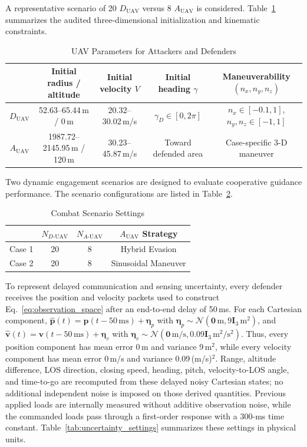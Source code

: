 \documentclass[lettersize,journal]{IEEEtran}
\begin{document}
A representative scenario of 20 $D_{\text{UAV}}$ versus 8 $A_{\text{UAV}}$ is considered.
Table~\ref{chushicanshu} summarizes the audited three-dimensional initialization and
kinematic constraints.

\begin{table}[!t]
\color{blue}
\centering
\caption{UAV Parameters for Attackers and Defenders}
\label{chushicanshu}
\renewcommand{\arraystretch}{1.6}
\begin{tabular}{ccccc}
\hline\hline
 & Initial radius / altitude & Initial velocity $V$ & Initial heading $\gamma$ & Maneuverability $(n_x,n_y,n_z)$ \\ \hline
$D_{\text{UAV}}$ & 52.63--65.44\,m / 0\,m & 20.32--30.02\,m/s & $\gamma_D\in[0,2\pi]$ & $n_x\in[-0.1,1]$, $n_y,n_z\in[-1,1]$ \\
$A_{\text{UAV}}$ & 1987.72--2145.95\,m / 120\,m & 30.23--45.87\,m/s & Toward defended area & Case-specific 3-D maneuver \\ \hline
\end{tabular}
\end{table}

Two dynamic engagement scenarios are designed to evaluate cooperative guidance performance.
The scenario configurations are listed in Table~\ref{changjingqingkuang}.

\begin{table}[!t]
\color{blue}
\centering
\renewcommand{\arraystretch}{1.4}
\caption{Combat Scenario Settings}
\label{changjingqingkuang}
\begin{tabular}{cccc}
\hline\hline
 & $N_{D\text{-UAV}}$ & $N_{A\text{-UAV}}$ & $A_{\text{UAV}}$ Strategy \\ \hline
Case 1 & 20 & 8 & Hybrid Evasion \\
Case 2 & 20 & 8 & Sinusoidal Maneuver \\ \hline
\end{tabular}
\end{table}

To represent delayed communication and sensing uncertainty, every defender receives the
position and velocity packets used to construct Eq.~\eqref{eq:observation_space} after an
end-to-end delay of 50\,ms. For each Cartesian component,
$\widehat{\mathbf p}(t)=\mathbf p(t-50\,\mathrm{ms})+\boldsymbol\eta_p$ with
$\boldsymbol\eta_p\sim\mathcal N(\mathbf0\,\mathrm{m},9\mathbf I_3\,\mathrm{m}^2)$, and
$\widehat{\mathbf v}(t)=\mathbf v(t-50\,\mathrm{ms})+\boldsymbol\eta_v$ with
$\boldsymbol\eta_v\sim\mathcal N(\mathbf0\,\mathrm{m/s},
0.09\mathbf I_3\,\mathrm{m}^2/\mathrm{s}^2)$. Thus, every position component has mean error
0\,m and variance 9\,m$^2$, while every velocity component has mean error 0\,m/s and variance
0.09\,(m/s)$^2$. Range, altitude difference, LOS direction, closing speed, heading, pitch,
velocity-to-LOS angle, and time-to-go are recomputed from these delayed noisy Cartesian states;
no additional independent noise is imposed on those derived quantities. Previous applied loads
are internally measured without additive observation noise, while the commanded loads pass
through a first-order response with a 300-ms time constant. Table~\ref{tab:uncertainty_settings}
summarizes these settings in physical units.
\end{document}

